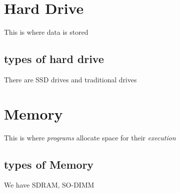 \documentclass[a4paper,12pt]{article}
\begin{document}

\clearpage

\section{Hard Drive}
This is where data is stored
\subsection{types of hard drive}
There are SSD drives and traditional drives
\clearpage

\section{Memory}

This is where \emph{programs} allocate space for their \emph{execution}

\subsection{types of Memory}

We have SDRAM, SO-DIMM
\printindex
\end{document}
